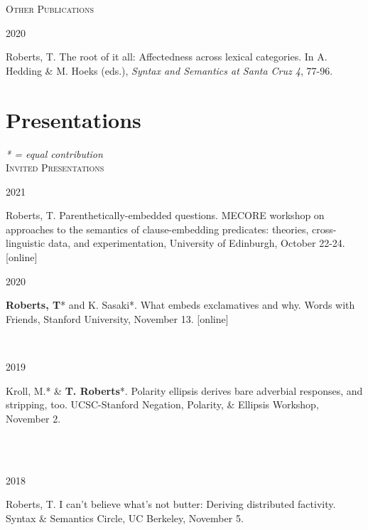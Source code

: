 \documentclass[12pt]{article} %
\begin{document}
\textsc{Other Publications}\\

\begin{minipage}[t]{3cm}
	2020
\end{minipage} \begin{minipage}[t]{\smallertextwidth}
	Roberts, T. The root of it all: Affectedness across lexical categories. In A. Hedding \& M. Hoeks (eds.), \textit{Syntax and Semantics at Santa Cruz 4}, 77-96.\end{minipage}



\section{Presentations}

\textit{* = equal contribution}\\

\textsc{Invited Presentations}\\

\begin{minipage}[t]{3cm}
	2021
\end{minipage}
\begin{minipage}[t]{\smallertextwidth}
	Roberts, T. Parenthetically-embedded questions. MECORE workshop on approaches to the semantics of clause-embedding predicates: theories, cross-linguistic data, and experimentation, University of Edinburgh, October 22-24. [online] \end{minipage}

\vspace{0.08cm}

\begin{minipage}[t]{3cm}
	2020
\end{minipage}
\begin{minipage}[t]{\smallertextwidth}
	\textbf{Roberts, T}* and K. Sasaki*. What embeds exclamatives and why. Words with Friends, Stanford University, November 13. [online] \end{minipage}\\

\begin{minipage}[t]{3cm}
	2019
\end{minipage}
\begin{minipage}[t]{\smallertextwidth}
	Kroll, M.* \& \textbf{T. Roberts}*. Polarity ellipsis derives bare adverbial responses, and stripping, too. UCSC-Stanford Negation, Polarity, \& Ellipsis Workshop, November 2. \end{minipage}\\
\\
\begin{minipage}[t]{3cm}
	2018
\end{minipage}
\begin{minipage}[t]{\smallertextwidth}
	Roberts, T. I can't believe what's not butter: Deriving distributed factivity. Syntax \& Semantics Circle, UC Berkeley, November 5. \end{minipage}\\
\end{document}
